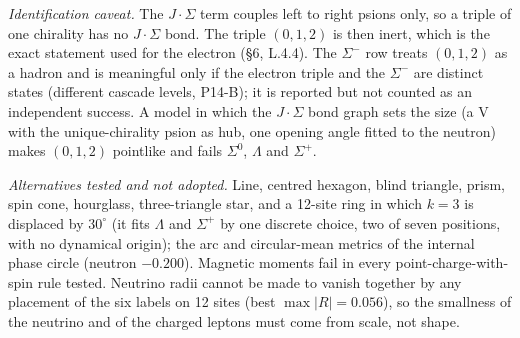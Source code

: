 \noindent \emph{Identification caveat.} The $J\!\cdot\!\Sigma$ term couples left to right psions only, so a triple of one chirality has no $J\!\cdot\!\Sigma$ bond. The triple $(0,1,2)$ is then inert, which is the exact statement used for the electron (\S6, L.4.4). The $\Sigma^-$ row treats $(0,1,2)$ as a hadron and is meaningful only if the electron triple and the $\Sigma^-$ are distinct states (different cascade levels, P14-B); it is reported but not counted as an independent success. A model in which the $J\!\cdot\!\Sigma$ bond graph sets the size (a V with the unique-chirality psion as hub, one opening angle fitted to the neutron) makes $(0,1,2)$ pointlike and fails $\Sigma^0$, $\Lambda$ and $\Sigma^+$.

\noindent \emph{Alternatives tested and not adopted.} Line, centred hexagon, blind triangle, prism, spin cone, hourglass, three-triangle star, and a 12-site ring in which $k=3$ is displaced by $30^\circ$ (it fits $\Lambda$ and $\Sigma^+$ by one discrete choice, two of seven positions, with no dynamical origin); the arc and circular-mean metrics of the internal phase circle (neutron $-0.200$). Magnetic moments fail in every point-charge-with-spin rule tested. Neutrino radii cannot be made to vanish together by any placement of the six labels on 12 sites (best $\max|R|=0.056$), so the smallness of the neutrino and of the charged leptons must come from scale, not shape.

